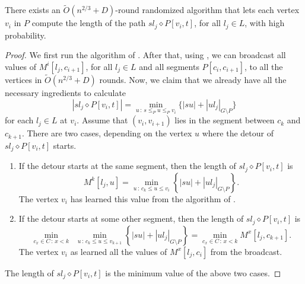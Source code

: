 \begin{lemma}[Part 1]
\label{lem : s to land}
There exists an $\widetilde{O}(n^{2/3}+D)$-round randomized algorithm that lets each vertex $v_i$ in $P$ compute the length of the path $sl_j \diamond P[v_{i},t]$, for all $l_j \in L$, with high probability.
\end{lemma}

\begin{proof}
We first run the algorithm of . After that, using , we can broadcast all values of $M^{i}[l_j,c_{i+1}]$, for all $l_j \in L$ and all segments $P[c_i, c_{i+1}]$, to all the vertices in $\widetilde{O}(n^{2/3}+D)$ rounds. Now, we claim that we already have all the necessary ingredients to calculate \[|sl_j \diamond P[v_{i},t]|= \min_{u \, : \, s \leq_P u \leq_P v_i} \{|su|+|ul_j|_{G \setminus P}\}\] for each $l_j \in L$ at $v_i$. Assume that $(v_i,v_{i+1})$ lies in the segment between $c_k$ and $c_{k+1}$. There are two cases, depending on the vertex $u$ where the detour of $sl_j \diamond P[v_{i},t]$ starts.

\begin{enumerate}

    \item If the detour starts at the same segment, then the length of $sl_j \diamond P[v_{i},t]$ is 
    \[M^k[l_j,u] = \min_{u \, : \, c_k \leq u \leq v_i} \left\{|su|+|ul_j|_{G \setminus P}\right\}.\] The vertex $v_i$ has learned this value from the algorithm of .

    \item If the detour starts at some other segment, then the length of $sl_j \diamond P[v_{i},t]$ is \[ \min_{c_x \in C \, : \, x < k} \, \,  \, \min_{u \, : \, c_k \leq u \leq v_{k+1}}  \left\{|su|+|ul_j|_{G \setminus P}\right\} = \min_{c_x \in C \, : \, x < k} M^{x}[l_j,c_{k+1}].\]  The vertex $v_i$ as learned  all the values of $M^{x}[l_j,c_i]$ from the broadcast.
\end{enumerate}
The length of $sl_j \diamond P[v_{i},t]$ is the minimum value of the above two cases.
\end{proof}

